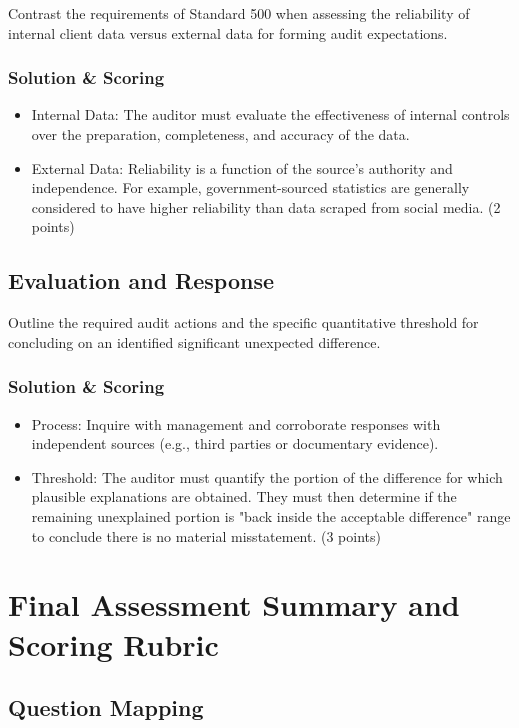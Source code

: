 \documentclass[12pt,a4paper]{memoir}
\begin{document}
Contrast the requirements of Standard 500 when assessing the reliability of internal client data versus external data for forming audit expectations.

\subsubsection{Solution \& Scoring}
\begin{itemize}
\item Internal Data: The auditor must evaluate the effectiveness of internal controls over the preparation, completeness, and accuracy of the data.
\item External Data: Reliability is a function of the source's authority and independence. For example, government-sourced statistics are generally considered to have higher reliability than data scraped from social media. (2 points)
\end{itemize}

\subsection{Evaluation and Response}

Outline the required audit actions and the specific quantitative threshold for concluding on an identified significant unexpected difference.

\subsubsection{Solution \& Scoring}
\begin{itemize}
\item Process: Inquire with management and corroborate responses with independent sources (e.g., third parties or documentary evidence).
\item Threshold: The auditor must quantify the portion of the difference for which plausible explanations are obtained. They must then determine if the remaining unexplained portion is "back inside the acceptable difference" range to conclude there is no material misstatement. (3 points)
\end{itemize}

\section{Final Assessment Summary and Scoring Rubric}

\subsection{Question Mapping}
\end{document}

